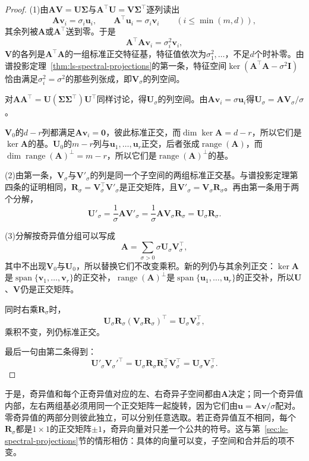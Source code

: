 \begin{proof}
(1)由$\bm A\bm V=\bm U\bm\Sigma$与$\bm A^\top\bm U=\bm V\bm\Sigma^\top$逐列读出
\[
 \bm A\bm v_i=\sigma_i\bm u_i,\qquad\bm A^\top\bm u_i=\sigma_i\bm v_i\qquad(i\leq\min(m,d)),
\]
其余列被$\bm A$或$\bm A^\top$送到零。于是
\[
 \bm A^\top\bm A\bm v_i=\sigma_i^2\bm v_i ,
\]
$\bm V$的各列是$\bm A^\top\bm A$的一组标准正交特征基，特征值依次为$\sigma_1^2,\ldots$，不足$d$个时补零。由谱投影定理~\ref{thm:ls-spectral-projections}的第一条，特征空间$\ker(\bm A^\top\bm A-\sigma^2\bm I)$恰由满足$\sigma_i^2=\sigma^2$的那些列张成，即$\bm V_\sigma$的列空间。

对$\bm A\bm A^\top=\bm U(\bm\Sigma\bm\Sigma^\top)\bm U^\top$同样讨论，得$\bm U_\sigma$的列空间。由$\bm A\bm v_i=\sigma\bm u_i$得$\bm U_\sigma=\bm A\bm V_\sigma/\sigma$。

$\bm V_0$的$d-r$列都满足$\bm A\bm v_i=\bm0$，彼此标准正交，而$\dim\ker\bm A=d-r$，所以它们是$\ker\bm A$的基。$\bm U_0$的$m-r$列与$\bm u_1,\ldots,\bm u_r$正交，后者张成$\operatorname{range}(\bm A)$，而$\dim\operatorname{range}(\bm A)^\perp=m-r$，所以它们是$\operatorname{range}(\bm A)^\perp$的基。

(2)由第一条，$\bm V_\sigma$与$\bm V'_\sigma$的列是同一个子空间的两组标准正交基。与谱投影定理第四条的证明相同，$\bm R_\sigma=\bm V_\sigma^\top\bm V'_\sigma$是正交矩阵，且$\bm V'_\sigma=\bm V_\sigma\bm R_\sigma$。再由第一条用于两个分解，
\[
 \bm U'_\sigma=\frac1\sigma\bm A\bm V'_\sigma=\frac1\sigma\bm A\bm V_\sigma\bm R_\sigma=\bm U_\sigma\bm R_\sigma .
\]

(3)分解按奇异值分组可以写成
\[
 \bm A=\sum_{\sigma>0}\sigma\bm U_\sigma\bm V_\sigma^\top ,
\]
其中不出现$\bm V_0$与$\bm U_0$，所以替换它们不改变乘积。新的列仍与其余列正交：$\ker\bm A$是$\operatorname{span}\{\bm v_1,\ldots,\bm v_r\}$的正交补，$\operatorname{range}(\bm A)^\perp$是$\operatorname{span}\{\bm u_1,\ldots,\bm u_r\}$的正交补，所以$\bm U$、$\bm V$仍是正交矩阵。

同时右乘$\bm R_\sigma$时，
\[
 \bm U_\sigma\bm R_\sigma(\bm V_\sigma\bm R_\sigma)^\top=\bm U_\sigma\bm V_\sigma^\top ,
\]
乘积不变，列仍标准正交。

最后一句由第二条得到：
\[
 \bm U'_\sigma\bm V_\sigma'^\top=\bm U_\sigma\bm R_\sigma\bm R_\sigma^\top\bm V_\sigma^\top=\bm U_\sigma\bm V_\sigma^\top .
\]
\end{proof}

于是，奇异值和每个正奇异值对应的左、右奇异子空间都由$\bm A$决定；同一个奇异值内部，左右两组基必须用同一个正交矩阵一起旋转，因为它们由$\bm u=\bm A\bm v/\sigma$配对。零奇异值的两部分则彼此独立，可以分别任意选取。若正奇异值互不相同，每个$\bm R_\sigma$都是$1\times1$的正交矩阵$\pm1$，奇异向量对只差一个公共的符号。这与第~\ref{sec:ls-spectral-projections}节的情形相仿：具体的向量可以变，子空间和合并后的项不变。

